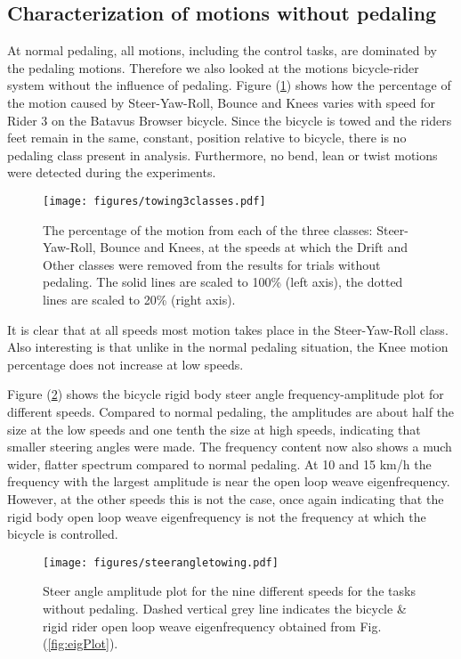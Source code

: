 \documentclass[smallextended]{svjour3}     %
\begin{document}
\subsection{Characterization of motions without pedaling}
\label{sec:noPed}
At normal pedaling, all motions, including the control tasks, are dominated by
the pedaling motions. Therefore we also looked at the motions bicycle-rider
system without the influence of pedaling. Figure (\ref{missjellybean}) shows
how the percentage of the motion caused by Steer-Yaw-Roll, Bounce and Knees
varies with speed for Rider 3 on the Batavus Browser bicycle. Since the bicycle
is towed and the riders feet remain in the
same, constant, position relative to bicycle, there is no pedaling class
present in analysis. Furthermore, no bend, lean or twist motions were detected
during the experiments.
\begin{figure}[tb]
    \centering
        \texttt{[image: figures/towing3classes.pdf]}\\
    \caption{The percentage of the motion from each of the three classes:
    Steer-Yaw-Roll, Bounce and Knees, at the speeds at which the Drift
    and Other classes were removed from the results for trials without
    pedaling. The solid lines are scaled to 100\% (left axis), the dotted lines
    are scaled to 20\% (right axis).}
    \label{missjellybean}
\end{figure}
It is clear that at all speeds most motion takes place in the Steer-Yaw-Roll
class. Also interesting is that unlike in the normal pedaling situation, the
Knee motion percentage does not increase at low speeds.

Figure (\ref{towingsteerangle}) shows the bicycle rigid body steer angle
frequency-amplitude plot for different speeds. Compared to normal pedaling,
the amplitudes are about half the size at the low speeds and one tenth the size
at high speeds, indicating that smaller steering angles were made. The
frequency content now also shows a much wider, flatter spectrum compared to
normal pedaling. At 10 and 15 km/h the frequency with the largest amplitude is
near the open loop weave eigenfrequency. However, at the other speeds this is
not the case, once again indicating that the rigid body open loop weave
eigenfrequency is not the frequency at which the bicycle is controlled.
\begin{figure}[tbp]
    \centering
        \texttt{[image: figures/steerangletowing.pdf]}\\
    \caption{Steer angle amplitude plot for the nine different speeds for the
    tasks without pedaling. Dashed vertical grey line indicates the bicycle \&
    rigid rider open loop weave eigenfrequency obtained from Fig.
    (\ref{fig:eigPlot}).}
    \label{towingsteerangle}
\end{figure}
\end{document}
